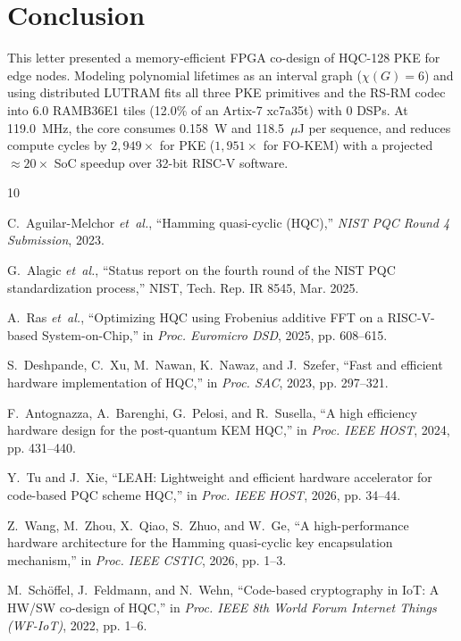 \documentclass[journal]{IEEEtran}
\begin{document}
\section{Conclusion}
This letter presented a memory-efficient FPGA co-design of HQC-128 PKE for edge nodes. Modeling polynomial lifetimes as an interval graph ($\chi(G)=6$) and using distributed LUTRAM fits all three PKE primitives and the RS-RM codec into 6.0 RAMB36E1 tiles (12.0\% of an Artix-7 xc7a35t) with 0 DSPs. At 119.0~MHz, the core consumes 0.158~W and 118.5~$\mu$J per sequence, and reduces compute cycles by $2,949\times$ for PKE ($1,951\times$ for FO-KEM) with a projected $\approx 20\times$ SoC speedup over 32-bit RISC-V software.


\begin{thebibliography}{10}

C.~Aguilar-Melchor \emph{et~al.}, ``Hamming quasi-cyclic ({HQC}),'' \emph{NIST PQC Round 4 Submission}, 2023.

G.~Alagic \emph{et~al.}, ``Status report on the fourth round of the {NIST} {PQC} standardization process,'' NIST, Tech. Rep. IR 8545, Mar. 2025.

A.~Ras \emph{et~al.}, ``Optimizing {HQC} using {Frobenius} additive {FFT} on a {RISC-V}-based {System-on-Chip},'' in \emph{Proc. Euromicro DSD}, 2025, pp. 608--615.

S.~Deshpande, C.~Xu, M.~Nawan, K.~Nawaz, and J.~Szefer, ``Fast and efficient hardware implementation of {HQC},'' in \emph{Proc. SAC}, 2023, pp. 297--321.

F.~Antognazza, A.~Barenghi, G.~Pelosi, and R.~Susella, ``A high efficiency hardware design for the post-quantum {KEM HQC},'' in \emph{Proc. IEEE HOST}, 2024, pp. 431--440.

Y.~Tu and J.~Xie, ``{LEAH}: Lightweight and efficient hardware accelerator for code-based {PQC} scheme {HQC},'' in \emph{Proc. IEEE HOST}, 2026, pp. 34--44.

Z.~Wang, M.~Zhou, X.~Qiao, S.~Zhuo, and W.~Ge, ``A high-performance hardware architecture for the {Hamming} quasi-cyclic key encapsulation mechanism,'' in \emph{Proc. IEEE CSTIC}, 2026, pp. 1--3.

M.~Sch{\"o}ffel, J.~Feldmann, and N.~Wehn, ``Code-based cryptography in {IoT}: A {HW/SW} co-design of {HQC},'' in \emph{Proc. IEEE 8th World Forum Internet Things (WF-IoT)}, 2022, pp. 1--6.

\end{thebibliography}
\end{document}
